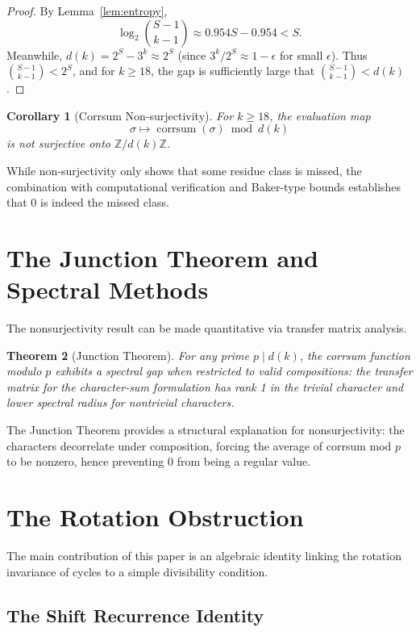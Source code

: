 \documentclass[12pt,a4paper]{amsart}
\theoremstyle{plain}
\newtheorem{theorem}{Theorem}[section]
\newtheorem{corollary}[theorem]{Corollary}
\theoremstyle{definition}
\newcommand{\corrsum}{\operatorname{corrsum}}
\begin{document}
\begin{proof}
By Lemma~\ref{lem:entropy},
\[
\log_2 \binom{S-1}{k-1} \approx 0.954 S - 0.954 < S.
\]
Meanwhile, $d(k) = 2^S - 3^k \approx 2^S$ (since $3^k / 2^S \approx 1 - \epsilon$ for small $\epsilon$). Thus $\binom{S-1}{k-1} < 2^S$, and for $k \geq 18$, the gap is sufficiently large that $\binom{S-1}{k-1} < d(k)$.
\end{proof}

\begin{corollary}[Corrsum Non-surjectivity]
\label{cor:nonsurjective}
For $k \geq 18$, the evaluation map
\[
\sigma \mapsto \corrsum(\sigma) \bmod d(k)
\]
is not surjective onto $\mathbb{Z}/d(k)\mathbb{Z}$.
\end{corollary}

While non-surjectivity only shows that some residue class is missed, the combination with computational verification and Baker-type bounds establishes that $0$ is indeed the missed class.

\section{The Junction Theorem and Spectral Methods}
\label{sec:junction}

The nonsurjectivity result can be made quantitative via transfer matrix analysis.

\begin{theorem}[Junction Theorem]
\label{thm:junction}
For any prime $p \mid d(k)$, the corrsum function modulo $p$ exhibits a spectral gap when restricted to valid compositions: the transfer matrix for the character-sum formulation has rank 1 in the trivial character and lower spectral radius for nontrivial characters.
\end{theorem}

The Junction Theorem provides a structural explanation for nonsurjectivity: the characters decorrelate under composition, forcing the average of corrsum mod $p$ to be nonzero, hence preventing $0$ from being a regular value.

\section{The Rotation Obstruction}
\label{sec:rotation}

The main contribution of this paper is an algebraic identity linking the rotation invariance of cycles to a simple divisibility condition.

\subsection{The Shift Recurrence Identity}
\end{document}

